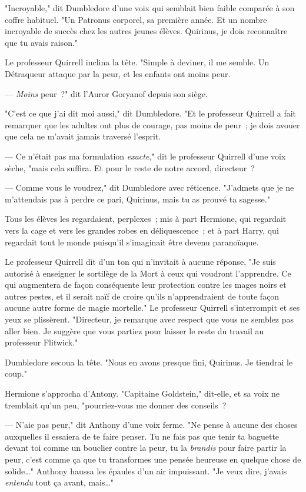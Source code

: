 "Incroyable," dit Dumbledore d'une voix qui semblait bien faible comparée à son coffre habituel. "Un Patronus corporel, sa première année. Et un nombre incroyable de succès chez les autres jeunes élèves. Quirinus, je dois reconnaître que tu avais raison."

Le professeur Quirrell inclina la tête. "Simple à deviner, il me semble. Un Détraqueur attaque par la peur, et les enfants ont moins peur.

--- \emph{Moins} peur~?" dit l'Auror Goryanof depuis son siège.

"C'est ce que j'ai dit moi aussi," dit Dumbledore. "Et le professeur Quirrell a fait remarquer que les adultes ont plus de courage, pas moins de peur~; je dois avouer que cela ne m'avait jamais traversé l'esprit.

--- Ce n'était pas ma formulation \emph{exacte}," dit le professeur Quirrell d'une voix sèche, "mais cela suffira. Et pour le reste de notre accord, directeur~?

--- Comme vous le voudrez," dit Dumbledore avec réticence. "J'admets que je ne m'attendais pas à perdre ce pari, Quirinus, mais tu as prouvé ta sagesse."

Tous les élèves les regardaient, perplexes~; mis à part Hermione, qui regardait vers la cage et vers les grandes robes en déliquescence~; et à part Harry, qui regardait tout le monde puisqu'il s'imaginait être devenu paranoïaque.

Le professeur Quirrell dit d'un ton qui n'invitait à aucune réponse, "Je suis autorisé à enseigner le sortilège de la Mort à ceux qui voudront l'apprendre. Ce qui augmentera de façon conséquente leur protection contre les mages noirs et autres pestes, et il serait naïf de croire qu'ils n'apprendraient de toute façon aucune autre forme de magie mortelle." Le professeur Quirrell s'interrompit et ses yeux se plissèrent. "Directeur, je remarque avec respect que vous ne semblez pas aller bien. Je suggère que vous partiez pour laisser le reste du travail au professeur Flitwick."

Dumbledore secoua la tête. "Nous en avons presque fini, Quirinus. Je tiendrai le coup."

Hermione s'approcha d'Antony. "Capitaine Goldstein," dit-elle, et sa voix ne tremblait qu'un peu, "pourriez-vous me donner des conseils~?

--- N'aie pas peur," dit Anthony d'une voix ferme. "Ne pense à aucune des choses auxquelles il essaiera de te faire penser. Tu ne fais pas que tenir ta baguette devant toi comme un bouclier contre la peur, tu la \emph{brandis} pour faire partir la peur, c'est comme ça que tu transformes une pensée heureuse en quelque chose de solide…" Anthony haussa les épaules d'un air impuissant. "Je veux dire, j'avais \emph{entendu} tout ça avant, mais…"

